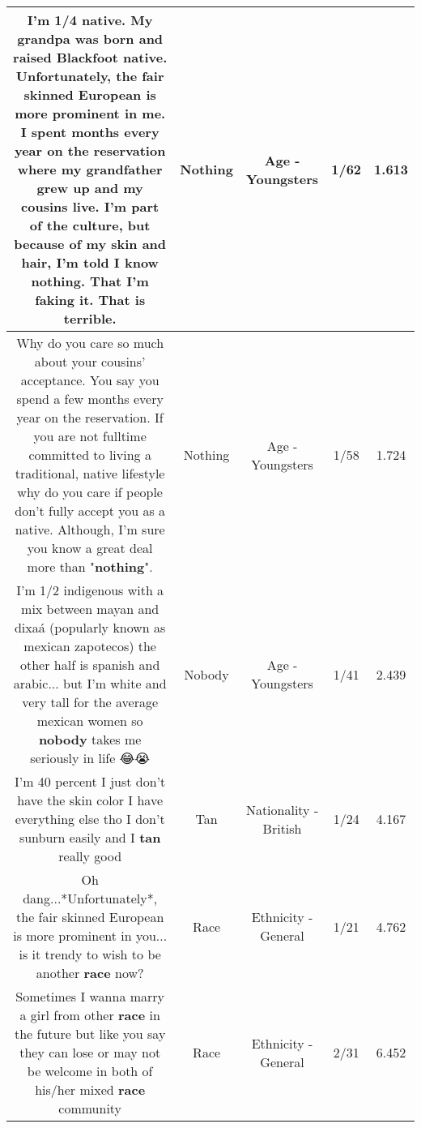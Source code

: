 \documentclass[11pt]{article}
\newlength\mylength
\begin{document}
\begin{center}
\begin{longtable}{|C{.65\mylength}|C{.30\mylength}|C{.12\mylength}|C{.12\mylength}|C{.12\mylength}|}
  \small I'm 1/4 native. My grandpa was born and raised Blackfoot native. Unfortunately, the fair skinned European is more prominent in me. I spent months every year on the reservation where my grandfather grew up and my cousins live. I'm part of the culture, but because of my skin and hair, I'm told I know \textbf{nothing}. That I'm faking it. That is terrible.\normalsize   & Nothing & Age - Youngsters & 1/62 & 1.613 \\  \hline
  \small Why do you care so much about your cousins' acceptance. You say you spend a few months every year on the reservation. If you are not fulltime committed to living a traditional, native lifestyle why do you care if people don't fully accept you as a native. Although, I'm sure you know a great deal more than "\textbf{nothing}".\normalsize   & Nothing & Age - Youngsters & 1/58 & 1.724 \\  \hline
  \small I'm 1/2 indigenous with a mix between mayan and dixaá (popularly known as mexican zapotecos) the other half is spanish and arabic... but I'm white and very tall for the average mexican women so \textbf{nobody} takes me seriously in life 😂😭\normalsize   & Nobody & Age - Youngsters & 1/41 & 2.439 \\  \hline
  \small I'm 40 percent I just don't have the skin color I have everything else tho I don't sunburn easily and I \textbf{tan} really good\normalsize   & Tan & Nationality - British & 1/24 & 4.167 \\  \hline
  \small Oh dang...*Unfortunately*, the fair skinned European is more prominent in you... is it trendy to wish to be another \textbf{race} now?\normalsize   & Race & Ethnicity - General & 1/21 & 4.762 \\  \hline
  \small Sometimes I wanna marry a girl from other \textbf{race} in the future but like you say they can lose or may not be welcome in both of his/her mixed \textbf{race} community\normalsize   & Race & Ethnicity - General & 2/31 & 6.452 \\  \hline

\end{longtable}
\end{center}
\end{document}
